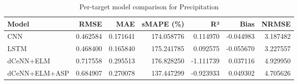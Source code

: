 \begin{table}
\caption{Per-target model comparison for Precipitation}
\begin{tabular}{lrrrrrr}
\toprule
Model & RMSE & MAE & sMAPE (\%) & R² & Bias & NRMSE \\
\midrule
CNN & 0.462584 & 0.171641 & 174.058776 & 0.114970 & -0.044983 & 3.187482 \\
LSTM & 0.468400 & 0.165840 & 175.241785 & 0.092575 & -0.055670 & 3.227557 \\
dCeNN+ELM & 0.717558 & 0.295513 & 176.828250 & -1.111739 & 0.037116 & 4.929950 \\
dCeNN+ELM+ASP & 0.684907 & 0.270078 & 137.447299 & -0.923933 & 0.049302 & 4.705626 \\
\bottomrule
\end{tabular}
\end{table}
